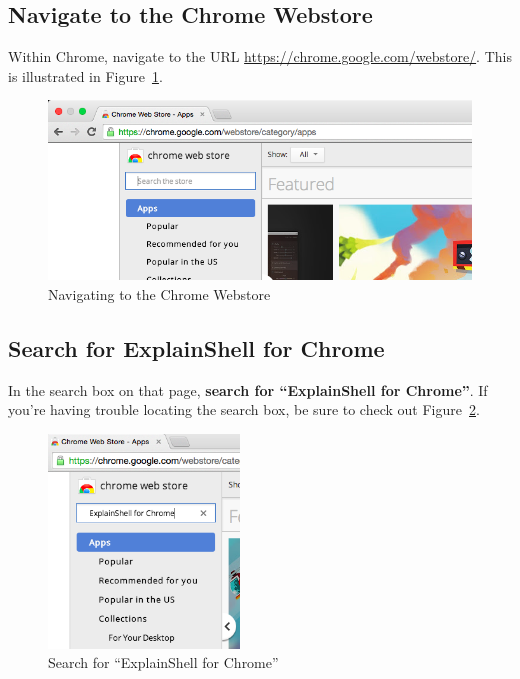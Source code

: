 \documentclass[11pt]{article}
\begin{document}
\subsection{Navigate to the Chrome Webstore}
Within Chrome, navigate to the URL \url{https://chrome.google.com/webstore/}. This is illustrated in Figure~\ref{chrome-webstore}.

\begin{figure}[H]
  \begin{center}
    \includegraphics[width=\textwidth,height=\textheight,keepaspectratio]{01chrome-webstore}
  \end{center}
  \caption{Navigating to the Chrome Webstore}
  \label{chrome-webstore}
\end{figure}

\subsection{Search for ExplainShell for Chrome}
In the search box on that page, \textbf{search for ``ExplainShell for Chrome''}. If you're having trouble locating the search box, be sure to check out Figure~\ref{search-box}.

\begin{figure}[H]
  \begin{center}
    \includegraphics[width=2in, keepaspectratio]{02search-box}
  \end{center}
  \caption{Search for ``ExplainShell for Chrome''}
  \label{search-box}
\end{figure}
\end{document}
